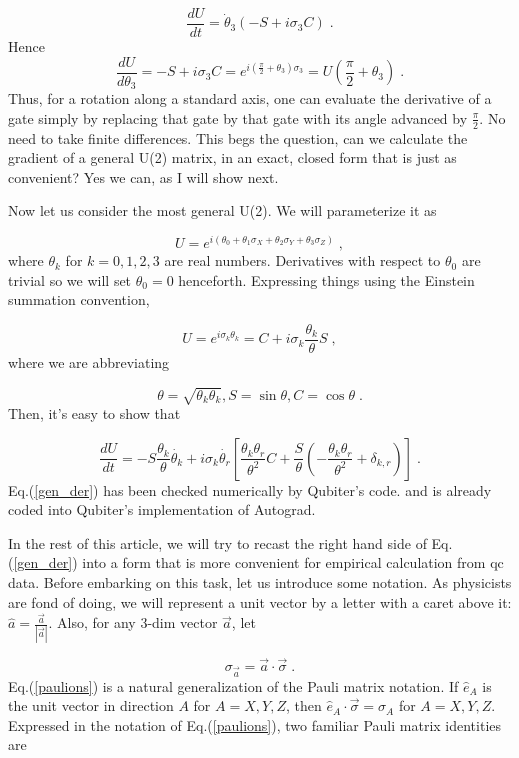 \documentclass[12pt]{article}
\newcommand{\beq}{\begin{equation}}
\newcommand{\eeq}{\end{equation}}
\begin{document}
\beq
\frac{dU}{dt} = \dot{\theta}_3(-S + i\sigma_3 C)
\;.
\eeq
Hence
\beq
\frac{dU}{d\theta_3}=
-S + i\sigma_3 C=e^{i(\frac{\pi}{2}+\theta_3)\sigma_3}
=U(\frac{\pi}{2}+\theta_3)
\;.
\eeq
Thus, for a rotation along a standard axis,
one can evaluate the derivative of a gate
simply
by replacing that gate by that gate
with its angle advanced by $\frac{\pi}{2}$.
No need to take finite differences.
This begs the question,
can we calculate the gradient
of a general U(2) matrix,
in an exact, closed form
that is just as  
convenient? Yes we can, as I will show next.

Now let us consider the most general U(2).
We will parameterize it as

\beq
U= e^{i(\theta_0 + \theta_1\sigma_X
+ \theta_2\sigma_Y
+ \theta_3\sigma_Z)}
\;,
\label{u2_pametrization}
\eeq
where $\theta_k$ for $k = 0, 1, 2, 3$ are real numbers.
Derivatives with respect to $\theta_0$
are trivial so we will set $\theta_0=0$ henceforth.
Expressing things using the Einstein summation convention,

\beq U = e^{i\sigma_k\theta_k} = C +
i\sigma_k \frac{\theta_k}{\theta} S
\;,
\eeq
where we are abbreviating

\beq
\theta = \sqrt{\theta_k\theta_k},
 S = \sin\theta, C = \cos \theta
 \;.
 \eeq
 Then, it's easy to show that

 \beq
 \frac{dU}{dt}=-S \frac{\theta_k}{\theta}
 \dot{\theta_k}+ i\sigma_k\dot{\theta_r}
 \left[\frac{\theta_k\theta_r}{\theta^2} C+
  \frac{S}{\theta}(-\frac{\theta_k\theta_r}{\theta^2}
  + \delta_{k, r})\right]
  \;.
  \label{gen_der}
  \eeq
 Eq.(\ref{gen_der}) has
 been checked numerically 
 by Qubiter's code. and is already
coded into Qubiter's implementation of Autograd.


In the rest of this article,
we will try to recast the right hand side of
 Eq.(\ref{gen_der}) into a form that
 is more convenient for empirical
 calculation from qc data.
Before embarking on this task,
let us introduce some notation.
As physicists are fond of doing, we will
represent a unit vector by
a letter with a caret above it:
$\hat{a} = \frac{\vec{a}}{|\vec{a}|}$.
Also, for any 3-dim vector $\vec{a}$, let

\beq
\sigma_{\vec{a}}=\vec{a}\cdot\vec{\sigma}
\;.
\label{paulions}
\eeq
Eq.(\ref{paulions}) is a natural generalization
of the Pauli matrix notation. If $\hat{e}_A$
is the unit vector in direction $A$ for $A=X,Y,Z$,
then $\hat{e}_A\cdot\vec{\sigma} = \sigma_A$ for
$A=X,Y,Z$. Expressed in
the notation of Eq.(\ref{paulions}),
two familiar Pauli matrix identities
are
\end{document}
